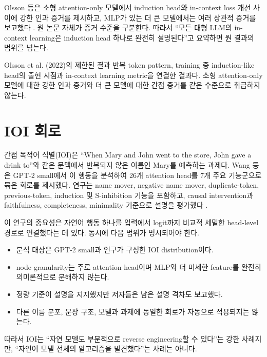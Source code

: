 Olsson 등은 소형 attention-only 모델에서 induction head와 in-context loss 개선 사이에 강한 인과 증거를 제시하고, MLP가 있는 더 큰 모델에서는 여러 상관적 증거를 보고했다 \citep{olsson2022induction}.
원 논문 자체가 증거 수준을 구분한다.
따라서 ``모든 대형 LLM의 in-context learning은 induction head 하나로 완전히 설명된다''고 요약하면 원 결과의 범위를 넘는다.

\begin{resultbox}{Olsson et al. (2022)의 제한된 결과}
반복 token pattern, training 중 induction-like head의 출현 시점과 in-context learning metric을 연결한 결과다.
소형 attention-only 모델에 대한 강한 인과 증거와 더 큰 모델에 대한 간접 증거를 같은 수준으로 취급하지 않는다.
\end{resultbox}

\section{IOI 회로}

간접 목적어 식별(IOI)은 ``When Mary and John went to the store, John gave a drink to''와 같은 문맥에서 반복되지 않은 이름인 Mary를 예측하는 과제다.
Wang 등은 GPT-2 small에서 이 행동을 분석하여 26개 attention head를 7개 주요 기능군으로 묶은 회로를 제시했다.
연구는 name mover, negative name mover, duplicate-token, previous-token, induction 및 S-inhibition 기능을 포함하고, causal intervention과 faithfulness, completeness, minimality 기준으로 설명을 평가했다 \citep{wang2022ioi}.

이 연구의 중요성은 자연어 행동 하나를 입력에서 logit까지 비교적 세밀한 head-level 경로로 연결했다는 데 있다.
동시에 다음 범위가 명시되어야 한다.

\begin{itemize}
  \item 분석 대상은 GPT-2 small과 연구가 구성한 IOI distribution이다.
  \item node granularity는 주로 attention head이며 MLP와 더 미세한 feature를 완전히 의미론적으로 분해하지 않는다.
  \item 정량 기준이 설명을 지지했지만 저자들은 남은 설명 격차도 보고했다.
  \item 다른 이름 분포, 문장 구조, 모델과 과제에 동일한 회로가 자동으로 적용되지는 않는다.
\end{itemize}

따라서 IOI는 ``자연 모델도 부분적으로 reverse engineering할 수 있다''는 강한 사례지만, ``자연어 모델 전체의 알고리즘을 발견했다''는 사례는 아니다.

